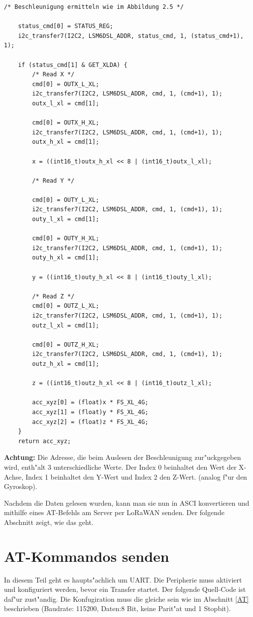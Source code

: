 \begin{lstlisting}[frame=single]
	/* Beschleunigung ermitteln wie im Abbildung 2.5 */
	
	status_cmd[0] = STATUS_REG;
	i2c_transfer7(I2C2, LSM6DSL_ADDR, status_cmd, 1, (status_cmd+1), 1);
	
	if (status_cmd[1] & GET_XLDA) {
		/* Read X */
		cmd[0] = OUTX_L_XL;
		i2c_transfer7(I2C2, LSM6DSL_ADDR, cmd, 1, (cmd+1), 1);
		outx_l_xl = cmd[1];
	
		cmd[0] = OUTX_H_XL;
		i2c_transfer7(I2C2, LSM6DSL_ADDR, cmd, 1, (cmd+1), 1);
		outx_h_xl = cmd[1];
	
		x = ((int16_t)outx_h_xl << 8 | (int16_t)outx_l_xl);
	
		/* Read Y */
	
		cmd[0] = OUTY_L_XL;
		i2c_transfer7(I2C2, LSM6DSL_ADDR, cmd, 1, (cmd+1), 1);
		outy_l_xl = cmd[1];
	
		cmd[0] = OUTY_H_XL;
		i2c_transfer7(I2C2, LSM6DSL_ADDR, cmd, 1, (cmd+1), 1);
		outy_h_xl = cmd[1];
	
		y = ((int16_t)outy_h_xl << 8 | (int16_t)outy_l_xl);
	
		/* Read Z */
		cmd[0] = OUTZ_L_XL;
		i2c_transfer7(I2C2, LSM6DSL_ADDR, cmd, 1, (cmd+1), 1);
		outz_l_xl = cmd[1];
	
		cmd[0] = OUTZ_H_XL;
		i2c_transfer7(I2C2, LSM6DSL_ADDR, cmd, 1, (cmd+1), 1);
		outz_h_xl = cmd[1];
	
		z = ((int16_t)outz_h_xl << 8 | (int16_t)outz_l_xl);
	
		acc_xyz[0] = (float)x * FS_XL_4G;
		acc_xyz[1] = (float)y * FS_XL_4G;
		acc_xyz[2] = (float)z * FS_XL_4G;
	}
	return acc_xyz;
\end{lstlisting}

\textbf{Achtung:} Die Adresse, die beim Auslesen der Beschleunigung
zur"uckgegeben wird, enth"alt 3 unterschiedliche Werte. Der Index 0 
beinhaltet den Wert der X-Achse, Index 1 beinhaltet den Y-Wert und 
Index 2 den Z-Wert. (analog f"ur den Gyroskop).

Nachdem die Daten gelesen wurden, kann man sie nun in ASCI 
konvertieren und mithilfe eines AT-Befehls am Server per LoRaWAN 
senden. Der folgende Abschnitt zeigt, wie das geht.


\section{AT-Kommandos senden}
In diesem Teil geht es haupts"achlich um UART. Die Peripherie muss 
aktiviert und konfiguriert werden, bevor ein Transfer startet. Der 
folgende Quell-Code ist daf"ur zust"andig.
Die Konfugiration muss die gleiche sein wie im Abschnitt \ref{AT} 
beschrieben (Baudrate: 115200, Daten:8 Bit, keine Parit"at und 1 
Stopbit).


